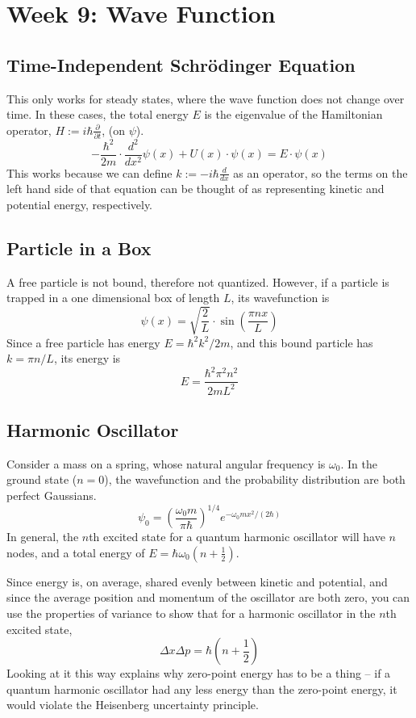 \documentclass[12pt]{article}
\begin{document}
\section{Week 9: Wave Function}

\subsection{Time-Independent Schrödinger Equation}
This only works for steady states, where the wave function does not change over time. In these cases, the total energy $E$ is the eigenvalue of the Hamiltonian operator, $H := i \hbar \frac{\partial}{\partial t}$, (on $\psi$).
\[ - \frac{\hbar^2}{2m} \cdot \frac{d^2}{dx^2} \psi(x) + U(x) \cdot \psi(x) = E \cdot \psi(x) \]
This works because we can define $k := -i \hbar \frac{d}{dx}$ as an operator, so the terms on the left hand side of that equation can be thought of as representing kinetic and potential energy, respectively.

\subsection{Particle in a Box}
A free particle is not bound, therefore not quantized. However, if a particle is trapped in a one dimensional box of length $L$, its wavefunction is
\[ \psi(x) = \sqrt{ \frac{2}{L} } \cdot \sin \left( \frac{\pi n x}{L} \right) \]
Since a free particle has energy $E = \hbar^2 k^2 / 2m$, and this bound particle has $k = \pi n / L$, its energy is
\[ E = \frac{\hbar^2 \pi^2 n^2}{2 m L^2} \]

\subsection{Harmonic Oscillator}
Consider a mass on a spring, whose natural angular frequency is $\omega_0$. In the ground state ($n=0$), the wavefunction and the probability distribution are both perfect Gaussians.
\[ \psi_0 = \left( \frac{\omega_0 m}{\pi \hbar} \right)^{1/4} e^{- \omega_0 m x^2 / (2 \hbar)} \]
In general, the $n$th excited state for a quantum harmonic oscillator will have $n$ nodes, and a total energy of $E= \hbar \omega_0 (n + \frac{1}{2})$.

Since energy is, on average, shared evenly between kinetic and potential, and since the average position and momentum of the oscillator are both zero, you can use the properties of variance to show that for a harmonic oscillator in the $n$th excited state,
\[ \Delta x \Delta p = \hbar (n + \frac{1}{2}) \]
Looking at it this way explains why zero-point energy has to be a thing -- if a quantum harmonic oscillator had any less energy than the zero-point energy, it would violate the Heisenberg uncertainty principle.
\end{document}
